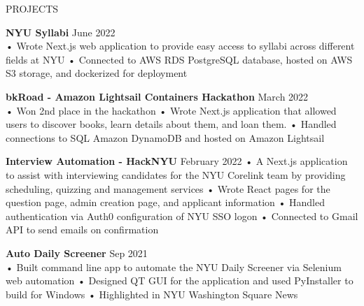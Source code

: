 \documentclass{resume} %
\begin{document}
\begin{rSection}{PROJECTS}

\textbf{\bf NYU Syllabi } \hfill June 2022 \\
• Wrote Next.js web application to provide easy access to syllabi across different fields at NYU \newline
• Connected to AWS RDS PostgreSQL database, hosted on AWS S3 storage, and dockerized for deployment

\textbf{\bf bkRoad - Amazon Lightsail Containers Hackathon } \hfill March 2022 \\
• Won 2nd place in the hackathon \newline
• Wrote Next.js application that allowed users to discover books, learn details about them, and loan them. \newline
• Handled connections to SQL Amazon DynamoDB and hosted on Amazon Lightsail

\textbf{\bf Interview Automation - HackNYU} \hfill February 2022 \newline
• A Next.js application to assist with interviewing candidates for the NYU Corelink team by providing scheduling, quizzing and management services\newline
• Wrote React pages for the question page, admin creation page, and applicant information \newline
• Handled authentication via Auth0 configuration of NYU SSO logon  \newline
• Connected to Gmail API to send emails on confirmation

\textbf{\bf Auto Daily Screener } \hfill Sep 2021 \\
• Built command line app to automate the NYU Daily Screener via Selenium web automation
\newline
• Designed QT GUI for the application and used PyInstaller to build for Windows \newline
• Highlighted in NYU Washington Square News




\end{rSection}
\end{document}
